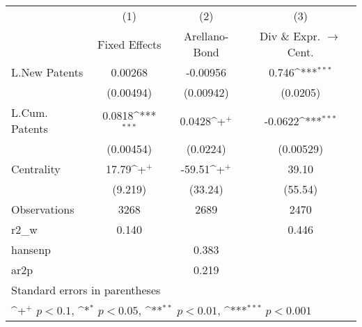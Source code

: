 {
\def\sym#1{\ifmmode^{#1}\else\(^{#1}\)\fi}
\begin{tabular}{l*{3}{c}}
\hline\hline
                    &\multicolumn{1}{c}{(1)}&\multicolumn{1}{c}{(2)}&\multicolumn{1}{c}{(3)}\\
                    &\multicolumn{1}{c}{Fixed Effects}&\multicolumn{1}{c}{Arellano-Bond}&\multicolumn{1}{c}{Div \& Expr. $\rightarrow$ Cent.}\\
\hline
L.New Patents       &     0.00268         &    -0.00956         &       0.746\sym{***}\\
                    &   (0.00494)         &   (0.00942)         &    (0.0205)         \\
L.Cum. Patents      &      0.0818\sym{***}&      0.0428\sym{+}  &     -0.0622\sym{***}\\
                    &   (0.00454)         &    (0.0224)         &   (0.00529)         \\
Centrality          &       17.79\sym{+}  &      -59.51\sym{+}  &       39.10         \\
                    &     (9.219)         &     (33.24)         &     (55.54)         \\
\hline
Observations        &        3268         &        2689         &        2470         \\
r2\_w                &       0.140         &                     &       0.446         \\
hansenp             &                     &       0.383         &                     \\
ar2p                &                     &       0.219         &                     \\
\hline\hline
\multicolumn{4}{l}{\footnotesize Standard errors in parentheses}\\
\multicolumn{4}{l}{\footnotesize \sym{+} \(p<0.1\), \sym{*} \(p<0.05\), \sym{**} \(p<0.01\), \sym{***} \(p<0.001\)}\\
\end{tabular}
}
